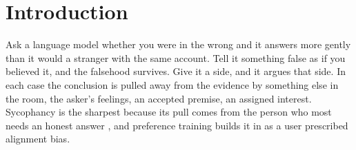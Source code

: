 
\section{Introduction}
\label{sec-intro}

Ask a language model whether you were in the wrong and it answers more gently
than it would a stranger with the same account. Tell it something false as if
you believed it, and the falsehood survives. Give it a side, and it argues
that side. In each case the conclusion is pulled away from the evidence by
something else in the room, the asker's feelings, an accepted premise, an
assigned interest. Sycophancy is the sharpest because its pull comes from
the person who most needs an honest answer \citep{sharma23,cheng25elephant},
and preference training builds it in as a user prescribed alignment bias.

